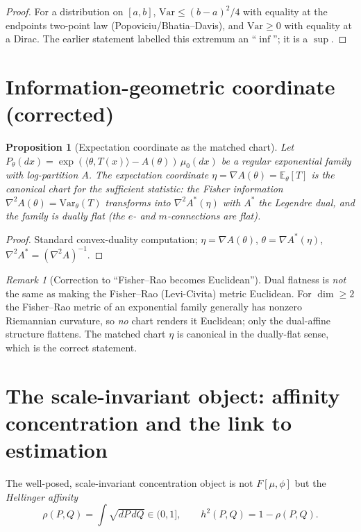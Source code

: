 \documentclass[11pt]{article}
\theoremstyle{plain}
\newtheorem{proposition}[theorem]{Proposition}
\theoremstyle{definition}
\theoremstyle{remark}
\newtheorem{remark}[theorem]{Remark}
\newcommand{\E}{\mathbb{E}}
\newcommand{\Var}{\mathrm{Var}}
\begin{document}
\begin{proof}
For a distribution on $[a,b]$, $\Var\le (b-a)^2/4$ with equality at the endpoints
two-point law (Popoviciu/Bhatia--Davis), and $\Var\ge0$ with equality at a Dirac.
The earlier statement labelled this extremum an ``$\inf$''; it is a $\sup$.
\end{proof}

\section{Information-geometric coordinate (corrected)}
\label{sec:infogeom}

\begin{proposition}[Expectation coordinate as the matched chart]\label{prop:expfam}
Let $P_\theta(dx)=\exp(\langle\theta,T(x)\rangle-A(\theta))\,\mu_0(dx)$ be a
regular exponential family with log-partition $A$. The expectation coordinate
$\eta=\nabla A(\theta)=\E_\theta[T]$ is the canonical chart for the sufficient
statistic: the Fisher information $\nabla^2 A(\theta)=\Var_\theta(T)$ transforms
into $\nabla^2 A^\ast(\eta)$ with $A^\ast$ the Legendre dual, and the family is
\emph{dually flat} (the $e$- and $m$-connections are flat).
\end{proposition}

\begin{proof}
Standard convex-duality computation; $\eta=\nabla A(\theta)$, $\theta=\nabla
A^\ast(\eta)$, $\nabla^2A^\ast=(\nabla^2A)^{-1}$.
\end{proof}

\begin{remark}[Correction to ``Fisher--Rao becomes Euclidean'']
Dual flatness is \emph{not} the same as making the Fisher--Rao (Levi-Civita)
metric Euclidean. For $\dim\ge 2$ the Fisher--Rao metric of an exponential family
generally has nonzero Riemannian curvature, so \emph{no} chart renders it
Euclidean; only the dual-affine structure flattens. The matched chart $\eta$ is
canonical in the dually-flat sense, which is the correct statement.
\end{remark}

\section{The scale-invariant object: affinity concentration and the link to estimation}
\label{sec:link}

The well-posed, scale-invariant concentration object is not $F[\mu,\phi]$ but the
\emph{Hellinger affinity}
\[
\rho(P,Q)=\int\sqrt{dP\,dQ}\in(0,1],\qquad h^2(P,Q)=1-\rho(P,Q).
\]
\end{document}
